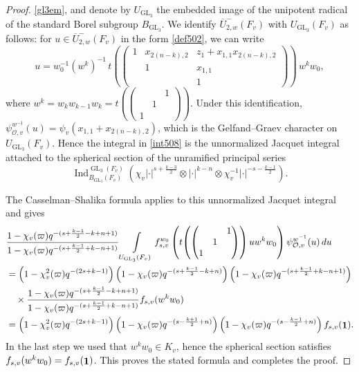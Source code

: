 \documentclass[11pt,notitlepage]{amsart}
\theoremstyle{definition}
\theoremstyle{remark}
\newcommand{\calO}{\mathcal{O}}
\DeclareMathOperator{\id}{{\bf 1}}
\DeclareMathOperator{\GL}{GL}
\DeclareMathOperator{\Ind}{Ind}
\begin{document}
\begin{proof}
\eqref{gl3em}, and denote by \(U_{\GL_3}\) the embedded image of the
unipotent radical of the standard Borel subgroup \(B_{\GL_3}\). We identify
\(\overline{U}^{-}_{2,w}(F_v)\) with \(U_{\GL_3}(F_v)\) as follows: for
\(u\in \overline{U}^{-}_{2,w}(F_v)\) in the form \eqref{def502}, we can write
\[
u = w_0^{-1} (w^k)^{-1} \,
t\!\left(\begin{pmatrix}
  1&x_{2(n-k),2}&z_1 + x_{1,1}x_{2(n-k),2}\\
  &1&x_{1,1}\\
  &&1
\end{pmatrix}\right)
\, w^kw_0,
\]
where
  $w^k=w_kw_{k-1}w_k
  =
  t\!\left(\begin{pmatrix}
    &&1\\
    &1&\\
    1&&
  \end{pmatrix}\right)$. Under this identification, $\psi^{w^{-1}}_{\calO,v}(u)=\psi_v(x_{1,1}+x_{2(n-k),2})$, which is the Gelfand--Graev character on \(U_{\GL_3}(F_v)\). Hence the
integral in \eqref{int508} is the unnormalized Jacquet integral attached to the
spherical section of the unramified principal series
\[
\Ind_{B_{\GL_3}(F_v)}^{\GL_3(F_v)}
\left(\chi_v|\cdot|^{s+\frac{k-3}{2}}\otimes |\cdot|^{k-n}\otimes
\chi_v^{-1}|\cdot|^{-s-\frac{k-1}{2}}\right).
\]

The Casselman--Shalika formula \cite{CS80} applies to this unnormalized
Jacquet integral and gives
\begin{equation}
  \begin{split}
    &\frac{1-\chi_v(\varpi)q^{-(s+\frac{k-1}{2}-k+n+1)}}{1-\chi_v(\varpi)q^{-(s+\frac{k-1}{2}+k-n+1)}}
    \int\limits_{U_{\GL_3}(F_v)}
    f^{w_0}_{s,v}\left(t\!\left(\begin{pmatrix}
      &&1\\
      &1&\\
      1&&
    \end{pmatrix}\right)uw^kw_0\right)
    \psi^{w^{-1}}_{\calO,v}(u)\,du\\
    &=
    \left(1-\chi_v^2(\varpi)q^{-(2s+k-1)}\right)
    \left(1-\chi_v(\varpi)q^{-(s+\frac{k-1}{2}-k+n)}\right)
    \left(1-\chi_v(\varpi)q^{-(s+\frac{k-1}{2}+k-n+1)}\right)\\
    &\quad\times
    \frac{1-\chi_v(\varpi)q^{-(s+\frac{k-1}{2}-k+n+1)}}{1-\chi_v(\varpi)q^{-(s+\frac{k-1}{2}+k-n+1)}}
    f_{s,v}(w^kw_0)\\
    &=
    \left(1-\chi_v^2(\varpi)q^{-(2s+k-1)}\right)
    \left(1-\chi_v(\varpi)q^{-(s-\frac{k+1}{2}+n)}\right)
    \left(1-\chi_v(\varpi)q^{-(s-\frac{k-1}{2}+n)}\right)
    f_{s,v}(\id).
  \end{split}
\end{equation}
In the last step we used that \(w^kw_0\in K_v\), hence the spherical section
satisfies \(f_{s,v}(w^kw_0)=f_{s,v}(\id)\). This proves the stated formula and
completes the proof.
\end{proof}
\end{document}
